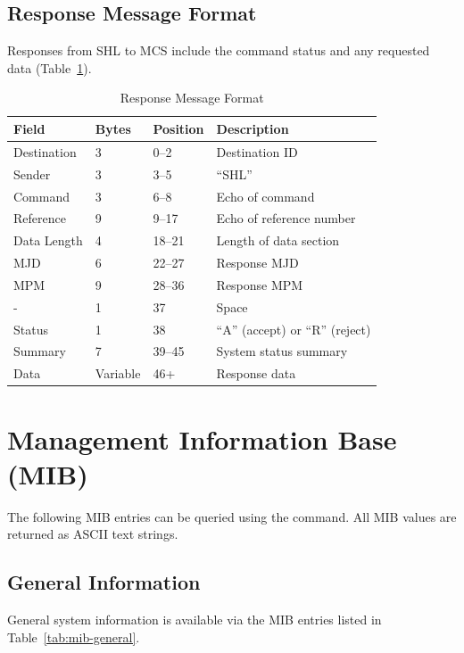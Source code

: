 \subsection{Response Message Format}

Responses from SHL to MCS include the command status and any requested data (Table~\ref{tab:resp-format}).

\begin{table}[htbp]
    \centering
    \caption{Response Message Format}
    \label{tab:resp-format}
    \begin{tabular}{llll}
        \toprule
        \textbf{Field} & \textbf{Bytes} & \textbf{Position} & \textbf{Description} \\
        \midrule
        Destination & 3 & 0--2 & Destination ID \\
        Sender & 3 & 3--5 & ``SHL'' \\
        Command & 3 & 6--8 & Echo of command \\
        Reference & 9 & 9--17 & Echo of reference number \\
        Data Length & 4 & 18--21 & Length of data section \\
        MJD & 6 & 22--27 & Response MJD \\
        MPM & 9 & 28--36 & Response MPM \\
        - & 1 & 37 & Space \\
        Status & 1 & 38 & ``A'' (accept) or ``R'' (reject) \\
        Summary & 7 & 39--45 & System status summary \\
        Data & Variable & 46+ & Response data \\
        \bottomrule
    \end{tabular}
\end{table}

\section{Management Information Base (MIB)}
\label{sec:mib}

The following MIB entries can be queried using the  command. All MIB values are returned as ASCII text strings.

\subsection{General Information}

General system information is available via the MIB entries listed in Table~\ref{tab:mib-general}.

